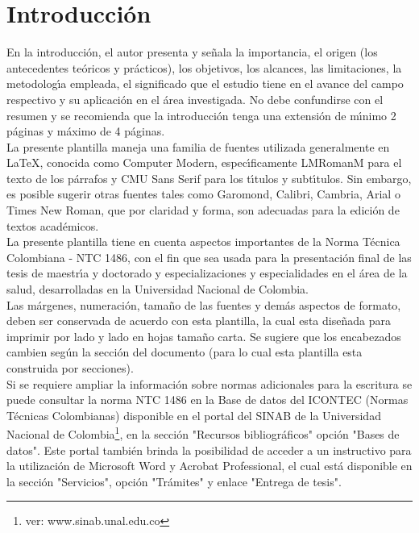 \chapter{Introducci\'{o}n}
En la introducci\'{o}n, el autor presenta y se\~{n}ala la importancia, el origen (los antecedentes te\'{o}ricos y pr\'{a}cticos), los objetivos, los alcances, las limitaciones, la metodolog\'{\i}a empleada, el significado que el estudio tiene en el avance del campo respectivo y su aplicaci\'{o}n en el \'{a}rea investigada. No debe confundirse con el resumen y se recomienda que la introducci\'{o}n tenga una extensi\'{o}n de m\'{\i}nimo 2 p\'{a}ginas y m\'{a}ximo de 4 p\'{a}ginas.\\

La presente plantilla maneja una familia de fuentes utilizada generalmente en LaTeX, conocida como Computer Modern, espec\'{\i}ficamente LMRomanM para el texto de los p\'{a}rrafos y CMU Sans Serif para los t\'{\i}tulos y subt\'{\i}tulos. Sin embargo, es posible sugerir otras fuentes tales como Garomond, Calibri, Cambria, Arial o Times New Roman, que por claridad y forma, son adecuadas para la edici\'{o}n de textos acad\'{e}micos.\\

La presente plantilla tiene en cuenta aspectos importantes de la Norma T\'{e}cnica Colombiana - NTC 1486, con el fin que sea usada para la presentaci\'{o}n final de las tesis de maestr\'{\i}a y doctorado y especializaciones y especialidades en el \'{a}rea de la salud, desarrolladas en la Universidad Nacional de Colombia.\\

Las m\'{a}rgenes, numeraci\'{o}n, tama\~{n}o de las fuentes y dem\'{a}s aspectos de formato, deben ser conservada de acuerdo con esta plantilla, la cual esta dise\~{n}ada para imprimir por lado y lado en hojas tama\~{n}o carta. Se sugiere que los encabezados cambien seg\'{u}n la secci\'{o}n del documento (para lo cual esta plantilla esta construida por secciones).\\

Si se requiere ampliar la informaci\'{o}n sobre normas adicionales para la escritura se puede consultar la norma NTC 1486 en la Base de datos del ICONTEC (Normas T\'{e}cnicas Colombianas) disponible en el portal del SINAB de la Universidad Nacional de Colombia\footnote{ver: www.sinab.unal.edu.co}, en la secci\'{o}n "Recursos bibliogr\'{a}ficos" opci\'{o}n "Bases de datos".  Este portal tambi\'{e}n brinda la posibilidad de acceder a un instructivo para la utilizaci\'{o}n de Microsoft Word y Acrobat Professional, el cual est\'{a} disponible en la secci\'{o}n "Servicios", opci\'{o}n "Tr\'{a}mites" y enlace "Entrega de tesis".\\

